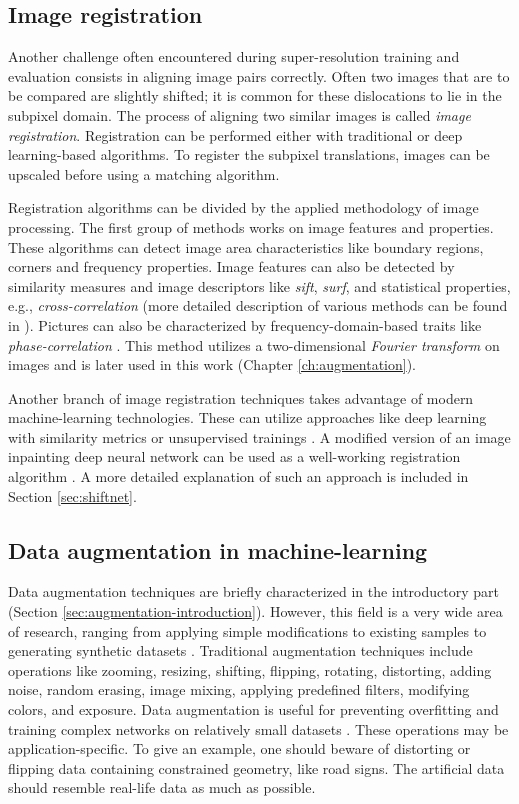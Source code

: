 \subsection{Image registration}
\label{sec:registration}
Another challenge often encountered during super-resolution training and evaluation consists in aligning image pairs correctly.
Often two images that are to be compared are slightly shifted; it is common for these dislocations to lie in the subpixel domain.
The process of aligning two similar images is called \textit{image registration}.
Registration can be performed either with traditional or deep learning-based algorithms.
To register the subpixel translations, images can be upscaled before using a matching algorithm.

Registration algorithms can be divided by the applied methodology of image processing.
The first group of methods works on image features and properties.
These algorithms can detect image area characteristics like boundary regions, corners and frequency properties.
Image features can also be detected by similarity measures and image descriptors like \textit{\gls{sift}}, \textit{\gls{surf}}, and statistical properties, e.g., \textit{cross-correlation} (more detailed description of various methods can be found in \cite{jain-2015-registration}).
Pictures can also be characterized by frequency-domain-based traits like \textit{phase-correlation} \cite{guizar-2008-registration}.
This method utilizes a two-dimensional \textit{Fourier transform} on images and is later used in this work (Chapter \ref{ch:augmentation}).

Another branch of image registration techniques takes advantage of modern machine-learning technologies.
These can utilize approaches like deep learning with similarity metrics or unsupervised trainings \cite{haskins-2020-deepregistration}.
A modified version of an image inpainting deep neural network can be used as a well-working registration algorithm \cite{deudon-2020-highresnet, zhaoyi-2018-shiftnet}.
A more detailed explanation of such an approach is included in Section \ref{sec:shiftnet}.

\subsection{Data augmentation in machine-learning}
\label{sec:data-augmentation-in-ml}
Data augmentation techniques are briefly characterized in the introductory part (Section \ref{sec:augmentation-introduction}).
However, this field is a very wide area of research, ranging from applying simple modifications to existing samples to generating synthetic datasets \cite{kar-2019-synthetic}.
Traditional augmentation techniques include operations like zooming, resizing, shifting, flipping, rotating, distorting, adding noise, random erasing, image mixing, applying predefined filters, modifying colors, and exposure.
Data augmentation is useful for preventing overfitting and training complex networks on relatively small datasets \cite{shorten-2019-augmentation}.
These operations may be application-specific.
To give an example, one should beware of distorting or flipping data containing constrained geometry, like road signs.
The artificial data should resemble real-life data as much as possible. 

